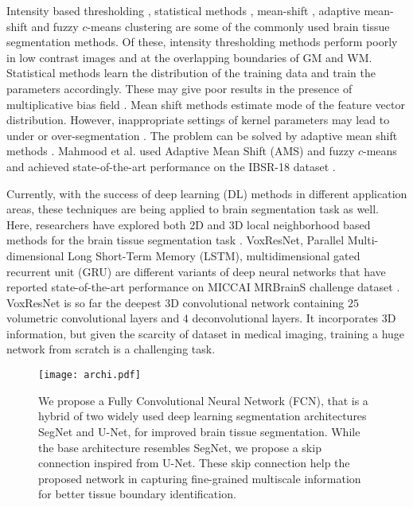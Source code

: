 \documentclass{article}
\begin{document}
Intensity based thresholding \cite{3}, statistical methods \cite{4,greenspan2006constrained,tohka2010brain}, mean-shift \cite{comaniciu2002mean}, adaptive mean-shift \cite{1, mayer2009adaptive} and fuzzy $c$-means clustering \cite{1} are some of the commonly used brain tissue segmentation methods. Of these, intensity thresholding methods perform poorly in low contrast images and at the overlapping boundaries of GM and WM. Statistical methods learn the distribution of the training data and train the parameters accordingly. These may give poor results in the presence of multiplicative bias field \cite{1,mayer2009adaptive}. Mean shift methods estimate mode of the feature vector distribution. However, inappropriate settings of kernel parameters may lead to under or over-segmentation \cite{1}. The problem can be solved by adaptive mean shift methods \cite{1, mayer2009adaptive}. Mahmood et al. \cite{1} used Adaptive Mean Shift (AMS) and fuzzy $c$-means and achieved state-of-the-art performance on the IBSR-18 dataset \cite{IBSR_dataset}.

Currently, with the success of deep learning (DL) methods in different application areas, these techniques are being applied to brain segmentation task as well. Here, researchers have explored both 2D and 3D local neighborhood based methods for the brain tissue segmentation task \cite{8,9}. VoxResNet, Parallel Multi-dimensional Long Short-Term Memory (LSTM), multidimensional gated recurrent unit (GRU) are different variants of deep neural networks that have reported state-of-the-art performance on MICCAI MRBrainS challenge dataset \cite{10, 12, parallel_lstm}. VoxResNet is so far the deepest 3D convolutional network containing $25$ volumetric convolutional layers and $4$ deconvolutional layers. It incorporates 3D information, but given the scarcity of dataset in medical imaging, training a huge network from scratch is a challenging task.

\begin{figure*}[!ht]
	\texttt{[image: archi.pdf]}
		\vspace{-1em}
	\caption{We propose a Fully Convolutional Neural Network (FCN), that is a hybrid of two widely used deep learning segmentation architectures SegNet and U-Net, for improved brain tissue segmentation. While the base architecture resembles SegNet, we propose a skip connection inspired from U-Net. These skip connection help the proposed network in capturing fine-grained multiscale information for better tissue boundary identification.}
	\label{fig:archi}
\end{figure*}
\end{document}
